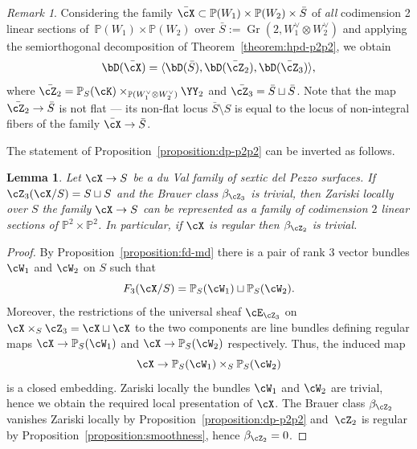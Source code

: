 \documentclass[11pt]{amsart}
\renewcommand{\P}{{\mathbb{P}}}
\DeclareMathOperator{\Gr}{\mathrm{Gr}}
\theoremstyle{plain}
\newtheorem{lemma}[theorem]{Lemma}
\theoremstyle{definition}
\theoremstyle{remark}
\newtheorem{remark}[theorem]{Remark}
\begin{document}
\begin{remark}
\label{remark:extended-family}
Considering the family $\bar\cX \subset \P(W_1) \times \P(W_2) \times \bar{S}$ of \emph{all} codimension 2 linear sections of~$\P(W_1) \times \P(W_2)$ over $\bar{S} := \Gr(2,W_1^\vee \otimes W_2^\vee)$ 
and applying the semiorthogonal decomposition of Theorem~\ref{theorem:hpd-p2p2}, we obtain
\begin{equation*}
\bD(\bar\cX) = \langle \bD(\bar{S}), \bD(\bar{\cZ}_2), \bD(\bar{\cZ}_3) \rangle,
\end{equation*}
where $\bar{\cZ_2} = \P_S(\cK) \times_{\P(W_1^\vee \otimes W_2^\vee)} \YY_2$ and $\bar{\cZ_3} = \bar{S} \sqcup \bar{S}$.
Note that the map $\bar{\cZ_2} \to \bar{S}$ is not flat --- its non-flat locus $\bar{S} \setminus S$ is equal 
to the locus of non-integral fibers of the family $\bar{\cX} \to \bar{S}$.
\end{remark}



The statement of Proposition~\ref{proposition:dp-p2p2} can be inverted as follows.

\begin{lemma}
\label{lemma:reconstructing-family}
Let $\cX \to S$ be a du Val family of sextic del Pezzo surfaces.
If $\cZ_3(\cX/S) = S \sqcup S$ and the Brauer class $\beta_{\cZ_3}$ is trivial, 
then Zariski locally over $S$ the family $\cX \to S$ can be represented as a family of codimension $2$ linear sections of\/ $\P^2 \times \P^2$.
In particular, if $\cX$ is regular then $\beta_{\cZ_2}$ is trivial.
\end{lemma}
\begin{proof}
By Proposition~\ref{proposition:fd-md} there is a pair of rank 3 vector bundles $\cW_1$ and $\cW_2$ on $S$ such that
\begin{equation*}
F_3(\cX/S) = \P_S(\cW_1) \sqcup \P_S(\cW_2).
\end{equation*}
Moreover, the restrictions of the universal sheaf $\cE_{\cZ_3}$ on $\cX \times_S \cZ_3 = \cX \sqcup \cX$ to the two components are line bundles defining regular maps $\cX \to \P_S(\cW_1)$ and $\cX \to \P_S(\cW_2)$ respectively.
Thus, the induced map 
\begin{equation*}
\cX \to \P_S(\cW_1) \times_S \P_S(\cW_2)
\end{equation*}
is a closed embedding.
Zariski locally the bundles $\cW_1$ and $\cW_2$ are trivial, hence we obtain the required local presentation of $\cX$.
The Brauer class $\beta_{\cZ_2}$ vanishes Zariski locally by Proposition~\ref{proposition:dp-p2p2}
and~$\cZ_2$ is regular by Proposition~\ref{proposition:smoothness}, hence $\beta_{\cZ_2} = 0$.
\end{proof}
\end{document}
